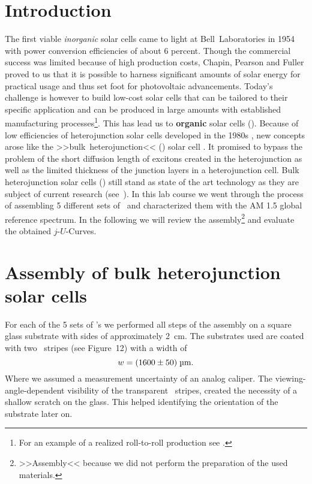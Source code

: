 \documentclass[a4paper,10pt,twocolumn]{article}
\begin{document}
\begin{extract*}

\section*{Introduction}%

The first viable \textit{inorganic} solar cells came to light at Bell~Laboratories in 1954 \cite{siliconSC_1}\cite{siliconSC_2} with power conversion efficiencies of about 6 percent. Though the commercial success was limited because of high production costs, Chapin, Pearson and Fuller proved to us that it is possible to harness significant amounts of solar energy for practical usage and thus set foot for photovoltaic advancements.\mypar
Today's challenge is however to build low-cost solar cells that can be tailored to their specific application and can be produced in large amounts with established manufacturing processes\footnote{For an example of a realized roll-to-roll production see \cite{rolltoroll}.}. This has lead us to \textbf{organic} solar cells (\OSC).\mypar
Because of low efficiencies of heterojunction solar cells developed in the 1980s \cite{tang}, new concepts arose like the >>bulk~heterojunction<< (\BHJ) solar cell \cite{heterojunk}. It promised to bypass the problem of the short diffusion length of excitons created in the heterojunction as well as the limited thickness of the junction layers in a heterojunction cell.\mypar
Bulk heterojunction solar cells (\BHSC) still stand as state of the art technology as they are subject of current research (see~\cite{modernbulkhetero}). In this lab course we went through the process of assembling 5 different sets of \BHSC\ and characterized them with the {\os\sefo AM 1.5} global reference spectrum. In the following we will review the assembly\footnote{>>Assembly<< because we did not perform the preparation of the used materials.} and evaluate the obtained $j$-$U$-Curves. 

\section{Assembly of bulk heterojunction solar cells}\label{sec:assembly}
For each of the 5 sets of \BHSC's we performed all steps of the assembly on a square glass substrate with sides of approximately 2~cm. The substrates used are coated with two \ITO\ stripes (see \cite{labdesc} Figure~12) with a width of
\begin{equation*}
w = (1600\pm50)\;\text{\textmu m}.
\end{equation*}
Where we assumed a measurement uncertainty of an analog caliper. The viewing-angle-dependent visibility of the transparent \ITO\ stripes, created the necessity of a shallow scratch on the glass. This helped identifying the orientation of the substrate later on.\mypar



\end{extract*}
\end{document}

